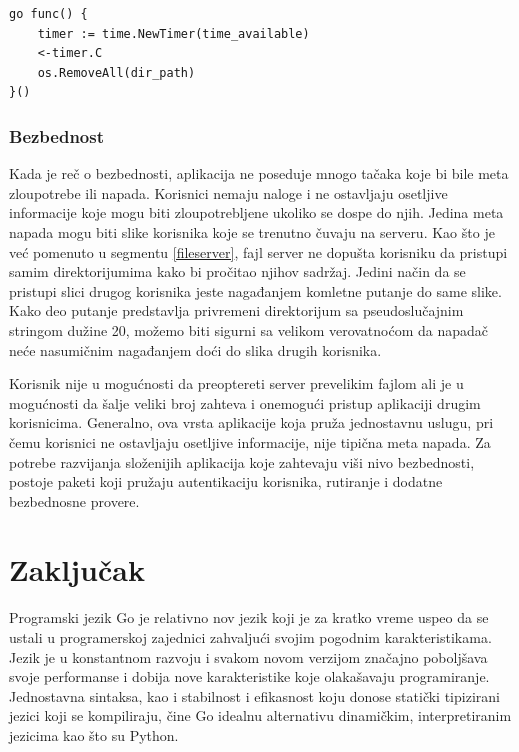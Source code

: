 \documentclass[12pt,oneside]{memoir}
\begin{document}
\begin{center}
\begin{lstlisting}[caption=Gorutina za brisanje privremenih direktorijuma,label={lst:clean},  backgroundcolor=\color{background}]
go func() {
	timer := time.NewTimer(time_available)
	<-timer.C
	os.RemoveAll(dir_path)
}()
\end{lstlisting}
\end{center}


\subsection{Bezbednost}

Kada je reč o bezbednosti, aplikacija ne poseduje mnogo tačaka koje bi bile meta zloupotrebe ili napada. Korisnici nemaju naloge i ne ostavljaju osetljive informacije koje mogu biti zloupotrebljene ukoliko se dospe do njih. Jedina meta napada mogu biti slike korisnika koje se trenutno čuvaju na serveru. Kao što je već pomenuto u segmentu \ref{fileserver}, fajl server ne dopušta korisniku da pristupi samim direktorijumima kako bi pročitao njihov sadržaj. Jedini način da se pristupi slici drugog korisnika jeste nagađanjem komletne putanje do same slike. Kako deo putanje predstavlja privremeni direktorijum sa pseudoslučajnim stringom dužine 20, možemo biti sigurni sa velikom verovatnoćom da napadač neće nasumičnim nagađanjem doći do slika drugih korisnika. 

Korisnik nije u mogućnosti da preoptereti server prevelikim fajlom ali je u mogućnosti da šalje veliki broj zahteva i onemogući pristup aplikaciji drugim korisnicima. Generalno, ova vrsta aplikacije koja pruža jednostavnu uslugu, pri čemu korisnici ne ostavljaju osetljive informacije, nije tipična meta napada. Za potrebe razvijanja složenijih aplikacija koje zahtevaju viši nivo bezbednosti, postoje paketi koji pružaju autentikaciju korisnika, rutiranje i dodatne bezbednosne provere. 

\chapter{Zaključak}

Programski jezik Go je relativno nov jezik koji je za kratko vreme uspeo da se ustali u programerskoj zajednici zahvaljući svojim pogodnim karakteristikama. Jezik je u konstantnom razvoju i svakom novom verzijom značajno poboljšava svoje performanse i dobija nove karakteristike koje olakašavaju programiranje. Jednostavna sintaksa, kao i stabilnost i efikasnost koju donose statički tipizirani jezici koji se kompiliraju, čine Go idealnu alternativu dinamičkim, interpretiranim jezicima kao što su Python.
\end{document}

